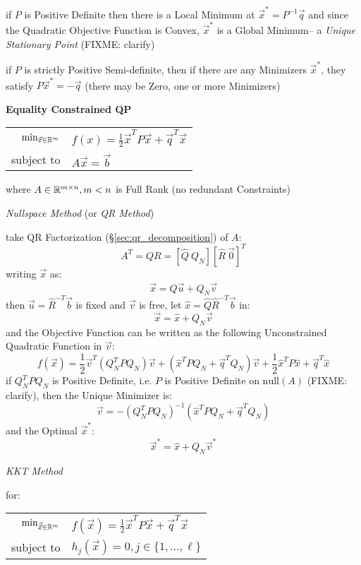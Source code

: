if $P$ is Positive Definite then there is a Local Minimum at $\vec{x}^* =
P^{-1}\vec{q}$ and since the Quadratic Objective Function is Convex,
$\vec{x}^*$ is a Global Minimum-- a \emph{Unique Stationary Point} (FIXME:
clarify)

if $P$ is strictly Positive Semi-definite, then if there are any Minimizers
$\vec{x}^*$, they satisfy $P\vec{x}^* = - \vec{q}$ (there may be Zero, one or
more Minimizers)


\textbf{Equality Constrained QP}

\begin{tabular}{r l}
  $\mathrm{min}_{\vec{x} \in \mathbb{R}^m}$ &
    $f(x) = \frac{1}{2}\vec{x}^T P\vec{x} + \vec{q}^T\vec{x}$ \\
  subject to & $A\vec{x} = \vec{b}$ \\
\end{tabular}

where $A \in \mathbb{R}^{m \times n}, m < n$ is Full Rank (no redundant
Constraints)

\emph{Nullspace Method} (or \emph{QR Method})

take QR Factorization (\S\ref{sec:qr_decomposition}) of $A$:
\[
  A^T = QR = [\hat{Q} \ Q_N] [\hat{R} \ \vec{0}]^T
\]
writing $\vec{x}$ as:
\[
  \vec{x} = \hat{Q}\vec{u} + Q_N\vec{v}
\]
then $\vec{u} = \hat{R}^{-T}\vec{b}$ is fixed and $\vec{v}$ is free,
let $\hat{x} = \hat{Q}\hat{R}^{-T}\vec{b}$ in:
\[
  \vec{x} = \hat{x} + Q_N\vec{v}
\]
and the Objective Function can be written as the following Unconstrained
Quadratic Function in $\vec{v}$:
\[
  f(\vec{x}) = \frac{1}{2}\vec{v}^T(Q_N^T P Q_N)\vec{v} +
    (\hat{x}^T PQ_N + \vec{q}^T Q_N)\vec{v} +
    \frac{1}{2}\hat{x}^T P\hat{x} + \vec{q}^T\hat{x}
\]
if $Q_N^T P Q_N$ is Positive Definite, i.e. $P$ is Positive Definite on
$\mathrm{null}(A)$ (FIXME: clarify), then the Unique Minimizer is:
\[
  \vec{v} = -(Q_N^T P Q_N)^{-1}(\hat{x}^T P Q_N + \vec{q}^T Q_N)
\]
and the Optimal $\vec{x}^*$:
\[
  \vec{x}^* = \hat{x} + Q_N\vec{v}^*
\]


\emph{KKT Method}

for:

\begin{tabular}{r l}
  $\mathrm{min}_{\vec{\vec{x}} \in \mathbb{R}^m}$ &
    $f(\vec{x}) = \frac{1}{2}\vec{x}^T P\vec{x} + \vec{q}^T\vec{x}$ \\
  subject to & $h_j(\vec{x}) = 0, j \in \{1,\ldots,\ell\}$ \\
\end{tabular}

